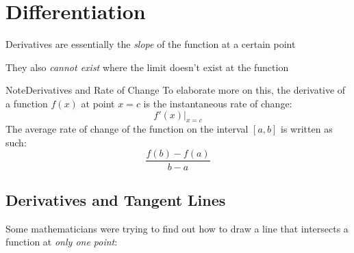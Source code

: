 \documentclass{MathNotes}
\newenvironment{note}[1]{\begin{YellowBox}{Note}{#1}}{\end{YellowBox}}
\begin{document}
\newpage
\section{Differentiation}
Derivatives are essentially the \textit{slope} of the function at a
certain point

They also \textit{cannot exist} where the limit doesn't exist at the 
function

\begin{note}{Derivatives and Rate of Change}
To elaborate more on this, the derivative of a function $f(x)$ at point $x=c$
is the instantaneous rate of change: $$f'(x)\Big|_{x=c}$$ The average rate of
change of the function on the interval $[a, b]$ is written as such:
$$\frac{f(b)-f(a)}{b-a}$$
\end{note}

\subsection{Derivatives and Tangent Lines}
\begin{multicols}{2}
Some mathematicians were trying to find out how to draw a line that intersects 
a function at \textit{only one point}:
\begin{center}
\end{center}
\end{multicols}
\end{document}
